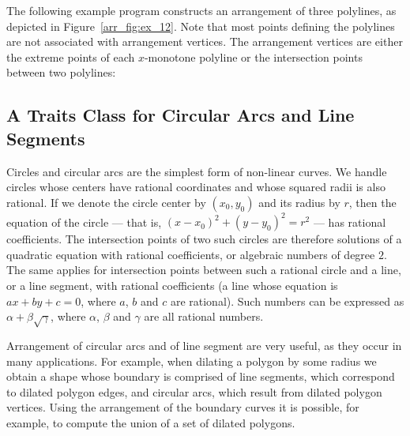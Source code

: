 The following example program constructs an arrangement of three
polylines, as depicted in Figure~\ref{arr_fig:ex_12}. Note that
most points defining the polylines are not associated with arrangement
vertices. The arrangement vertices are either the extreme points of
each $x$-monotone polyline or the intersection points between two
polylines:


\subsection{A Traits Class for Circular Arcs and Line Segments
  \label{arr_ssec:tr_circ_seg}}

Circles and circular arcs are the simplest form of non-linear curves.
We handle circles whose centers have rational coordinates and whose
squared radii is also rational. If we denote the circle center by $(x_0,y_0)$
and its radius by $r$, then the equation of the circle --- that is,
$(x - x_0)^2 + (y - y_0)^2 = r^2$ --- has rational coefficients.
The intersection points of two such circles are therefore solutions
of a quadratic equation with rational coefficients, or algebraic numbers
of degree $2$. The same applies for intersection points between such a
rational circle and a line, or a line segment, with rational coefficients
(a line whose equation is $ax + by + c = 0$, where $a$, $b$ and $c$ are
rational). Such numbers can be expressed as $\alpha + \beta\sqrt{\gamma}$,
where $\alpha$, $\beta$ and $\gamma$ are all rational numbers.

Arrangement of circular arcs and of line segment are very useful, as they
occur in many applications. For example, when dilating a polygon by some
radius we obtain a shape whose boundary is comprised of line segments,
which correspond to dilated polygon edges, and circular arcs, which
result from dilated polygon vertices. Using the arrangement of the
boundary curves it is possible, for example, to compute the union of a set
of dilated polygons.

